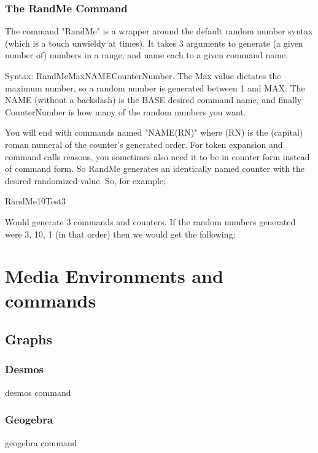\documentclass{ximera}
\begin{document}
		\subsubsection{The RandMe Command}
		The command "RandMe" is a wrapper around the default random number syntax (which is a touch unwieldy at times). It takes 3 arguments to generate (a given number of) numbers in a range, and name each to a given command name.
		
		Syntax: RandMe{Max}{NAME}{CounterNumber}. The Max value dictates the maximum number, so a random number is generated between 1 and MAX. The NAME (without a backslash) is the BASE desired command name, and finally CounterNumber is how many of the random numbers you want.
		
		You will end with commands named "NAME(RN)" where (RN) is the (capital) roman numeral of the counter's generated order. 
		For token expansion and command calls reasons, you sometimes also need it to be in counter form instead of command form. So RandMe generates an identically named counter with the desired randomized value.
		So, for example;
		
		RandMe{10}{Test}{3} 
		
		Would generate 3 commands and counters. If the random numbers generated were 3, 10, 1 (in that order) then we would get the following;
		
		\newcommand{\TestI}{3}
		\setcounter{TestI}{3}
		
		\newcommand{\TestII}{10}
		\setcounter{TestII}{10}
		
		\newcommand{\TestIII}{1}
		\setcounter{TestIII}{1}
		
\section{Media Environments and commands}
	\subsection{Graphs}
	
		\subsubsection{Desmos}
			desmos command
			
		\subsubsection{Geogebra}
			geogebra command
			
\end{document}
